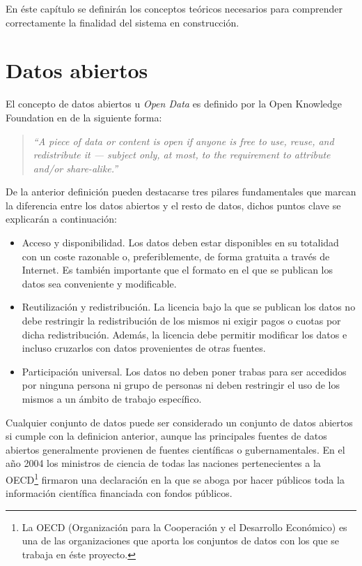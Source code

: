 En éste capítulo se definirán los conceptos teóricos necesarios para comprender correctamente la finalidad del sistema en construcción.

\section{Datos abiertos}
El concepto de datos abiertos u \textit{Open Data} es definido por la Open Knowledge Foundation en \cite{opendefinition} de la siguiente forma:
\begin{quote}
\textit{``A piece of data or content is open if anyone is free to use, reuse, and redistribute it — subject only, at most, to the requirement to attribute and/or share-alike.''}
\end{quote}

De la anterior definición pueden destacarse tres pilares fundamentales que marcan la diferencia entre los datos abiertos y el resto de datos, dichos puntos clave se explicarán a continuación:
\begin{itemize}
\item Acceso y disponibilidad. Los datos deben estar disponibles en su totalidad con un coste razonable o, preferiblemente, de forma gratuita a través de Internet.  Es también importante que el formato en el que se publican los datos sea conveniente y modificable.
\item Reutilización y redistribución.  La licencia bajo la que se publican los datos no debe restringir la redistribución de los mismos ni exigir pagos o cuotas por dicha redistribución.  Además, la licencia debe permitir modificar los datos e incluso cruzarlos con datos provenientes de otras fuentes.
\item Participación universal.  Los datos no deben poner trabas para ser accedidos por ninguna persona ni grupo de personas ni deben restringir el uso de los mismos a un ámbito de trabajo específico.
\end{itemize}

Cualquier conjunto de datos puede ser considerado un conjunto de datos abiertos si cumple con la definicion anterior, aunque las principales fuentes de datos abiertos generalmente provienen de fuentes científicas o gubernamentales.  En el año 2004 los ministros de ciencia de todas las naciones pertenecientes a la OECD\footnote{La OECD (Organización para la Cooperación y el Desarrollo Económico) es una de las organizaciones que aporta los conjuntos de datos con los que se trabaja en éste proyecto.} firmaron una declaración en la que se aboga por hacer públicos toda la información científica financiada con fondos públicos.

